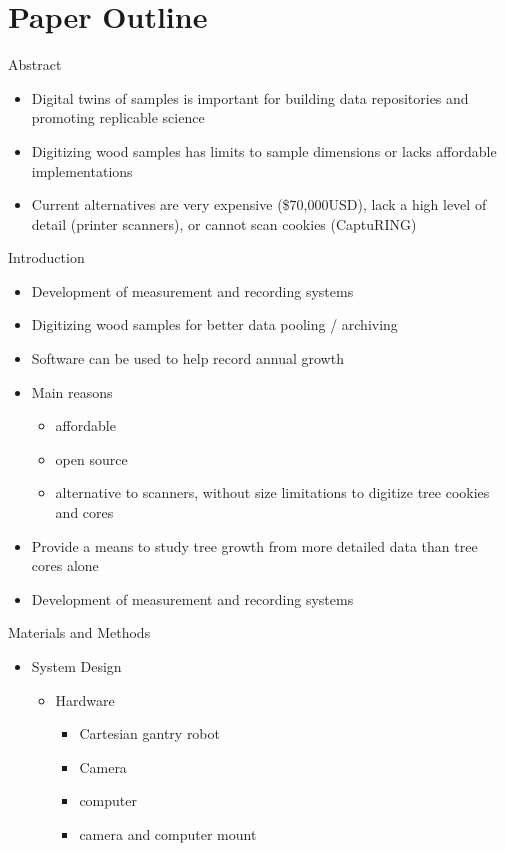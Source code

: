 \documentclass{article}
\begin{document}
\section {Paper Outline}
\begin{outline}[itemize]

\1 Abstract
\begin{itemize}
	\item  Digital twins of samples is important for building data repositories and promoting replicable science
	\item  Digitizing wood samples has limits to sample dimensions or lacks affordable implementations
	\item 	Current alternatives are very expensive (\$70,000USD), lack a high level of detail (printer scanners), or cannot scan cookies (CaptuRING)
\end{itemize}
\item Introduction
	\begin{itemize}
	\item Development of measurement and recording systems
	\item Digitizing wood samples for better data pooling / archiving
	\item Software can be used to help record annual growth 
	\item Main reasons 
		\begin{itemize}
		\item affordable
		\item open source
		\item  alternative to scanners, without size limitations to digitize tree cookies and cores 
		\end{itemize}
	\item Provide a means to study tree growth from more detailed data than tree cores alone
	\item Development of measurement and recording systems
	\end{itemize}
\item Materials and Methods
	\begin{itemize}
	\item System Design 
		\begin{itemize}
		\item Hardware
			\begin{itemize}
			\item Cartesian gantry robot
			\item Camera
			\item computer
			\item camera and computer mount

\end{itemize}
\end{itemize}
\end{itemize}
\end{outline}
\end{document}
